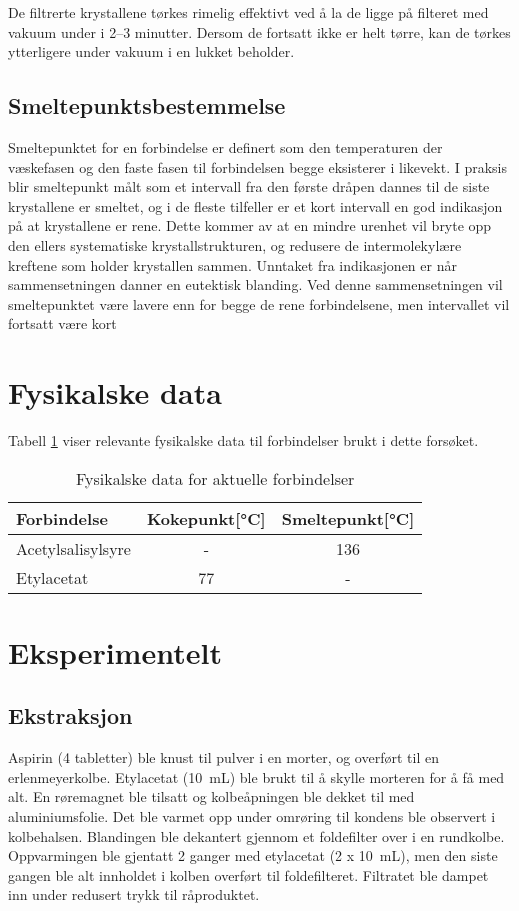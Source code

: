 De filtrerte krystallene tørkes rimelig effektivt ved å la de ligge på filteret med vakuum under i 2–3 minutter. Dersom de fortsatt ikke er helt tørre, kan de tørkes ytterligere under vakuum i en lukket beholder.

\subsection{Smeltepunktsbestemmelse}
Smeltepunktet for en forbindelse er definert som den temperaturen der væskefasen og den faste fasen til forbindelsen begge eksisterer i likevekt\cite{raymond2013general2nd}. I praksis blir smeltepunkt målt som et intervall fra den første dråpen dannes til de siste krystallene er smeltet, og i de fleste tilfeller er et kort intervall en god indikasjon på at krystallene er rene\cite{harwood1999experimental2nd}. Dette kommer av at en mindre urenhet vil bryte opp den ellers systematiske krystallstrukturen, og redusere de intermolekylære kreftene som holder krystallen sammen. Unntaket fra indikasjonen er når sammensetningen danner en eutektisk blanding\cite{harwood1999experimental2nd,snl}. Ved denne sammensetningen vil smeltepunktet være lavere enn for begge de rene forbindelsene, men intervallet vil fortsatt være kort

\section{Fysikalske data}
Tabell \ref{tab:fysdata} viser relevante fysikalske data til forbindelser brukt i dette forsøket. 
\begin{table}[ht!]
	\begin{center}
		\caption{Fysikalske data for aktuelle forbindelser \cite{CRC}}
		\label{tab:fysdata}
		\begin{tabular}{l c c}
		\toprule
		Forbindelse & Kokepunkt[\si{\celsius}] & Smeltepunkt[\si{\celsius}]\\
		\midrule
		Acetylsalisylsyre & - & 136\\
		Etylacetat & 77 & -\\
		\bottomrule
		\end{tabular}
	\end{center}
\end{table}



\section{Eksperimentelt}
\subsection{Ekstraksjon}
Aspirin (4 tabletter) ble knust til pulver i en morter, og overført til en erlenmeyerkolbe.  Etylacetat (\SI{10}{\milli\liter}) ble brukt til å skylle morteren for å få med alt. En røremagnet ble tilsatt og kolbeåpningen ble dekket til med aluminiumsfolie. Det ble varmet opp under omrøring til kondens ble observert i kolbehalsen. Blandingen ble dekantert gjennom et foldefilter over i en rundkolbe. Oppvarmingen ble gjentatt 2 ganger med etylacetat (2 x \SI{10}{\milli\liter}), men den siste gangen ble alt innholdet i kolben overført til foldefilteret. Filtratet ble dampet inn under redusert trykk til råproduktet.
